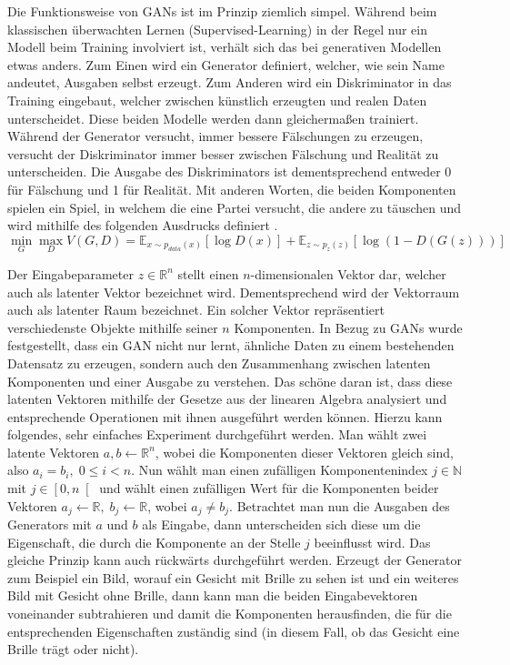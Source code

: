 Die Funktionsweise von GANs ist im Prinzip ziemlich simpel. Während beim
klassischen überwachten Lernen (Supervised-Learning) in der Regel nur ein
Modell beim Training involviert ist, verhält sich das bei generativen Modellen
etwas anders. Zum Einen wird ein Generator definiert, welcher, wie sein Name
andeutet, Ausgaben selbst erzeugt. Zum Anderen wird ein Diskriminator in das
Training eingebaut, welcher zwischen künstlich erzeugten und realen Daten
unterscheidet. Diese beiden Modelle werden dann gleichermaßen trainiert.
Während der Generator versucht, immer bessere Fälschungen zu erzeugen, versucht
der Diskriminator immer besser zwischen Fälschung und Realität zu
unterscheiden. Die Ausgabe des Diskriminators ist dementsprechend entweder 0
für Fälschung und 1 für Realität. Mit anderen Worten, die beiden Komponenten
spielen ein Spiel, in welchem die eine Partei versucht, die andere zu täuschen
und wird mithilfe des folgenden Ausdrucks definiert \cite{goodfellow2014generative}.
\[
\min_G \max_D V(G, D) = \mathbb{E}_{x \sim p_{data}(x)}\left[ \log D(x) \right] + \mathbb{E}_{z \sim p_z(z)}\left[ \log (1 - D(G(z))) \right]
\]

Der Eingabeparameter $z \in \mathbb{R}^n$ stellt einen $n$-dimensionalen Vektor
dar, welcher auch als latenter Vektor bezeichnet wird. Dementsprechend wird der
Vektorraum auch als latenter Raum bezeichnet. Ein solcher Vektor repräsentiert
verschiedenste Objekte mithilfe seiner $n$ Komponenten. In Bezug zu GANs wurde
festgestellt, dass ein GAN nicht nur lernt, ähnliche Daten zu einem bestehenden
Datensatz zu erzeugen, sondern auch den Zusammenhang zwischen latenten
Komponenten und einer Ausgabe zu verstehen. Das schöne daran ist, dass diese
latenten Vektoren mithilfe der Gesetze aus der linearen Algebra analysiert und
entsprechende Operationen mit ihnen ausgeführt werden können. Hierzu kann
folgendes, sehr einfaches Experiment durchgeführt werden. Man wählt zwei
latente Vektoren $a, b \leftarrow \mathbb{R}^n$, wobei die Komponenten dieser
Vektoren gleich sind, also $a_i = b_i, \; 0 \leq i < n$. Nun wählt man einen
zufälligen Komponentenindex $j \in \mathbb{N}$ mit $j \in \left[0, n\right[$
und wählt einen zufälligen Wert für die Komponenten beider Vektoren $a_j
\leftarrow \mathbb{R},\; b_j \leftarrow \mathbb{R}$, wobei $a_j \neq b_j$.
Betrachtet man nun die Ausgaben des Generators mit $a$ und $b$ als Eingabe,
dann unterscheiden sich diese um die Eigenschaft, die durch die Komponente an
der Stelle $j$ beeinflusst wird. Das gleiche Prinzip kann auch rückwärts
durchgeführt werden. Erzeugt der Generator zum Beispiel ein Bild, worauf ein
Gesicht mit Brille zu sehen ist und ein weiteres Bild mit Gesicht ohne
Brille, dann kann man die beiden Eingabevektoren voneinander subtrahieren und
damit die Komponenten herausfinden, die für die entsprechenden Eigenschaften
zuständig sind (in diesem Fall, ob das Gesicht eine Brille trägt oder nicht).

